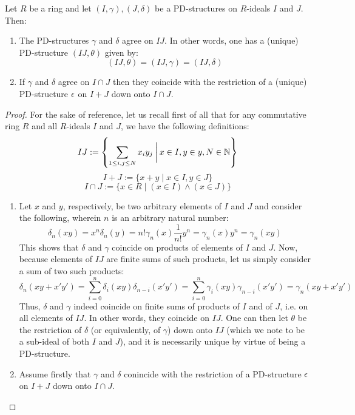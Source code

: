                 \begin{proposition}
                    Let $R$ be a ring and let $(I, \gamma), (J, \delta)$ be a PD-structures on $R$-ideals $I$ and $J$. Then:
                        \begin{enumerate}
                            \item The PD-structures $\gamma$ and $\delta$ agree on $IJ$. In other words, one has a (unique) PD-structure $(IJ, \theta)$ given by:
                                $$(IJ, \theta) = (IJ, \gamma) = (IJ, \delta)$$
                            \item If $\gamma$ and $\delta$ agree on $I \cap J$ then they coincide with the restriction of a (unique) PD-structure $\epsilon$ on $I + J$ down onto $I \cap J$.
                        \end{enumerate}
                \end{proposition}
                    \begin{proof}
                        For the sake of reference, let us recall first of all that for any commutative ring $R$ and all $R$-ideals $I$ and $J$, we have the following definitions:
                            $$IJ := \left\{\sum_{1 \leq i, j \leq N} x_iy_j \: \bigg| \: x \in I, y \in y, N \in \mathbb{N} \right\}$$
                            $$I + J := \{x + y \mid x \in I, y \in J\}$$
                            $$I \cap J := \{x \in R \mid (x \in I) \wedge (x \in J)\}$$
                        \begin{enumerate}
                            \item Let $x$ and $y$, respectively, be two arbitrary elements of $I$ and $J$ and consider the following, wherein $n$ is an arbitrary natural number:
                                $$\delta_n(xy) = x^n\delta_n(y) = n!\gamma_n(x) \frac{1}{n!}y^n = \gamma_n(x)y^n = \gamma_n(xy)$$
                            This shows that $\delta$ and $\gamma$ coincide on products of elements of $I$ and $J$. Now, because elements of $IJ$ are finite sums of such products, let us simply consider a sum of two such products:
                                $$\delta_n(xy + x'y') = \sum_{i = 0}^n \delta_i(xy)\delta_{n - i}(x'y') = \sum_{i = 0}^n \gamma_i(xy)\gamma_{n - i}(x'y') = \gamma_n(xy + x'y')$$
                            Thus, $\delta$ and $\gamma$ indeed coincide on finite sums of products of $I$ and of $J$, i.e. on all elements of $IJ$. In other words, they coincide on $IJ$. One can then let $\theta$ be the restriction of $\delta$ (or equivalently, of $\gamma$) down onto $IJ$ (which we note to be a sub-ideal of both $I$ and $J$), and it is necessarily unique by virtue of being a PD-structure.
                            \item Assume firstly that $\gamma$ and $\delta$ conincide with the restriction of a PD-structure $\epsilon$ on $I + J$ down onto $I \cap J$. 
                        \end{enumerate}
                    \end{proof}
                    
